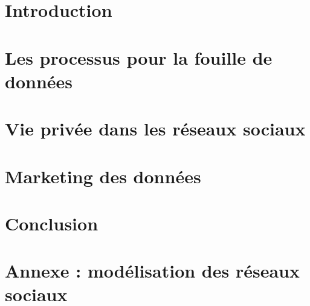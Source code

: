 \section{Introduction}


\section{Les processus pour la fouille de données}


\section{Vie privée dans les réseaux sociaux}


\section{Marketing des données}


\section{Conclusion}


\section{Annexe : modélisation des réseaux sociaux}
